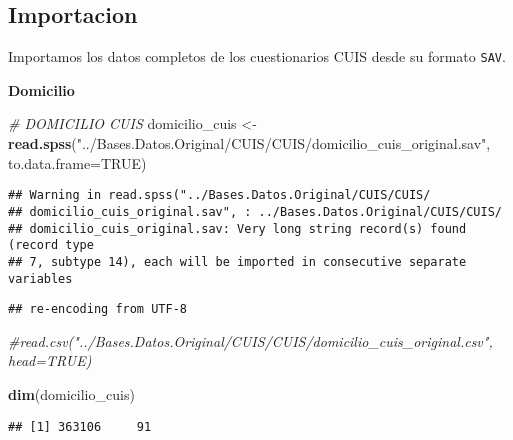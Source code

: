 \documentclass[11pt,]{article}
\newenvironment{Shaded}{\begin{snugshade}}{\end{snugshade}}
\newcommand{\KeywordTok}[1]{\textcolor[rgb]{0.13,0.29,0.53}{\textbf{#1}}}
\newcommand{\DataTypeTok}[1]{\textcolor[rgb]{0.13,0.29,0.53}{#1}}
\newcommand{\DecValTok}[1]{\textcolor[rgb]{0.00,0.00,0.81}{#1}}
\newcommand{\StringTok}[1]{\textcolor[rgb]{0.31,0.60,0.02}{#1}}
\newcommand{\CommentTok}[1]{\textcolor[rgb]{0.56,0.35,0.01}{\textit{#1}}}
\newcommand{\OtherTok}[1]{\textcolor[rgb]{0.56,0.35,0.01}{#1}}
\newcommand{\OperatorTok}[1]{\textcolor[rgb]{0.81,0.36,0.00}{\textbf{#1}}}
\newcommand{\NormalTok}[1]{#1}
\begin{document}
\subsection{Importacion}\label{importacion}

Importamos los datos completos de los cuestionarios CUIS desde su
formato \texttt{SAV}.

\textbf{Domicilio}

\begin{Shaded}
\begin{Highlighting}[]
\CommentTok{# DOMICILIO CUIS}
\NormalTok{domicilio_cuis <-}\StringTok{ }\KeywordTok{read.spss}\NormalTok{(}\StringTok{"../Bases.Datos.Original/CUIS/CUIS/domicilio_cuis_original.sav"}\NormalTok{, }\DataTypeTok{to.data.frame=}\OtherTok{TRUE}\NormalTok{)}
\end{Highlighting}
\end{Shaded}

\begin{verbatim}
## Warning in read.spss("../Bases.Datos.Original/CUIS/CUIS/
## domicilio_cuis_original.sav", : ../Bases.Datos.Original/CUIS/CUIS/
## domicilio_cuis_original.sav: Very long string record(s) found (record type
## 7, subtype 14), each will be imported in consecutive separate variables
\end{verbatim}

\begin{verbatim}
## re-encoding from UTF-8
\end{verbatim}

\begin{Shaded}
\begin{Highlighting}[]
                  \CommentTok{#read.csv("../Bases.Datos.Original/CUIS/CUIS/domicilio_cuis_original.csv", head=TRUE)}

\KeywordTok{dim}\NormalTok{(domicilio_cuis)}
\end{Highlighting}
\end{Shaded}

\begin{verbatim}
## [1] 363106     91
\end{verbatim}

\begin{Shaded}
\end{Shaded}
\end{document}
